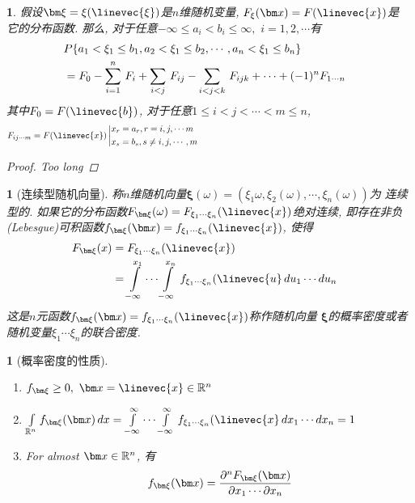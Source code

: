 \newtheorem{about_random_vector_and_its_function}[theorem_root]{\lemma}
\begin{about_random_vector_and_its_function}
假设\(\bm\xi = \xi(\linevec{\xi})\)是\(n\)维随机变量, \(F_\xi(\bm x) = F(\linevec{x})\)是
它的分布函数. 那么, 对于任意\(-\infty\le a_i<b_i\le\infty,\,\,i=1, 2, \cdots\)有
\begin{align}
&P\{a_1<\xi_1\le b_1, a_2<\xi_1\le b_2,\cdots, a_n<\xi_1\le b_n\}\cr
&=F_0 - \sum\limits_{i=1}^n\,F_i + \sum\limits_{i<j}\,F_{ij} - 
\sum\limits_{i<j<k}\,F_{ijk} + \cdots + (-1)^nF_{1\cdots n}
\end{align}
其中\(F_0 = F(\linevec{b})\), 对于任意\(1\le i<j<\cdots<m\le n\),
\begin{align}
F_{ij\cdots m} = F(\linevec{x})\left|\vcenter{\noindent$x_r = a_r, r = i,j,\cdots m\newline x_s = b_s, s\ne i, j,\cdots, m$}\right.
\end{align}
\begin{proof}Too long\end{proof}
\end{about_random_vector_and_its_function}

\newtheorem{properties_of_above_function}[theorem_root]{\theorem}


\newtheorem{disc_random_vector}[theorem_root]{}
\newtheorem{cont_random_vector}[theorem_root]{}
\begin{cont_random_vector}[连续型随机向量]
称\(n\)维随机向量\(\bm \xi(\omega) = (\xi_1{\omega}, \xi_2(\omega),\cdots, \xi_n(\omega))\)为
连续型的. 如果它的分布函数\(F_{\bm\xi}(\omega) = F_{\xi_1\cdots\xi_n}(\linevec{x})\)绝对连续, 
即存在非负(Lebesgue)可积函数\(f_{\bm\xi}(\bm x) = f_{\xi_1\cdots\xi_n}(\linevec{x})\), 使得
\begin{align}
    F_{\bm\xi}(x) &= F_{\xi_1\cdots\xi_n}(\linevec{x})\cr
    &= \int\limits_{-\infty}^{x_1}\cdots\int\limits_{-\infty}^{x_n}\,f_{\xi_1\cdots\xi_n}(\linevec{u}\,du_1\cdots du_n
\end{align}
这是\(n\)元函数\(f_{\bm\xi}(\bm x) = f_{\xi_1\cdots\xi_n}(\linevec{x})\)称作随机向量
\(\bm\xi\)的概率密度或者随机变量\(\xi_1\cdots\xi_n\)的联合密度.
\end{cont_random_vector}

\newtheorem{properties_of_cont_random_vector}[theorem_root]{\lemma}
\begin{properties_of_cont_random_vector}[概率密度的性质]
\ \par
\begin{enumerate}
\item \(f_{\bm\xi} \ge 0,\,\,\bm x = \linevec{x}\in\Rs^n\)
\item \(\int\limits_{\Rs^n}f_{\bm\xi}(\bm x)\,dx = \int\limits_{-\infty}^{\infty}\cdots\int\limits_{-\infty}^{\infty}\,f_{\xi_1\cdots\xi_n}(\linevec{x}\,dx_1\cdots dx_n = 1\)
\item For almost \(\bm x\in\Rs^n\), 有
\begin{align}
    f_{\bm\xi}(\bm x) = {\partial^nF_{\bm\xi}(\bm x)\over \partial x_1\cdots\partial x_n}
\end{align}
\end{enumerate}
\end{properties_of_cont_random_vector}


